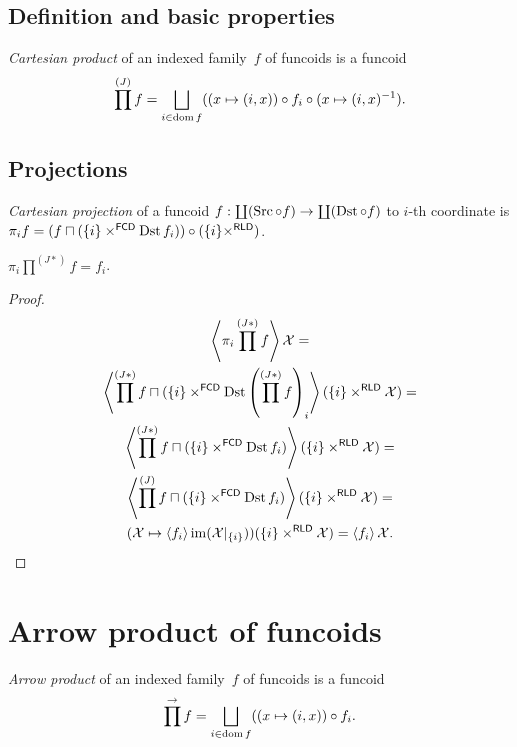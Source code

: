 \subsection{Definition and basic properties}

\begin{defn}
\emph{Cartesian product} of an indexed family~$f$ of funcoids is
a funcoid \[ \prod^{(J)} f=\bigsqcup_{i\in\dom f}((x\mapsto(i,x))\circ f_i\circ(x\mapsto(i,x)^{-1}). \]
\end{defn}

\subsection{Projections}

\begin{defn}
\emph{Cartesian projection} of a funcoid $f: \coprod(\operatorname{Src}\circ f)\to\coprod(\operatorname{Dst}\circ f)$ to $i$-th coordinate is
$\pi_i f=
(f\sqcap(\{i\}\times^{\mathsf{FCD}}\operatorname{Dst} f_i))\circ
(\{i\}\times^{\mathsf{RLD}})$.
\end{defn}

\begin{thm}
$\pi_i\prod^{(J\ast)}f=f_i$.
\end{thm}

\begin{proof}
\begin{multline*}
\left\langle \pi_i\prod^{(J\ast)}f\right\rangle\mathcal{X} =\\
\left\langle \prod^{(J\ast)}f\sqcap(\{i\}\times^{\mathsf{FCD}}\operatorname{Dst} \left(\prod^{(J\ast)}f\right)_i\right\rangle(\{i\}\times^{\mathsf{RLD}}\mathcal{X})=\\
\left\langle \prod^{(J\ast)}f\sqcap(\{i\}\times^{\mathsf{FCD}}\operatorname{Dst} f_i)\right\rangle(\{i\}\times^{\mathsf{RLD}}\mathcal{X})=\\
\left\langle \prod^{(J)}f\sqcap(\{i\}\times^{\mathsf{FCD}}\operatorname{Dst} f_i)\right\rangle(\{i\}\times^{\mathsf{RLD}}\mathcal{X})=\\
(\mathcal{X}\mapsto\left\langle f_i\right\rangle\operatorname{im}(\mathcal{X}|_{\{i\}}))(\{i\}\times^{\mathsf{RLD}}\mathcal{X})=
\left\langle f_i\right\rangle\mathcal{X}.
\end{multline*}
\end{proof}

\section{Arrow product of funcoids}

\begin{defn}
\emph{Arrow product} of an indexed family~$f$ of funcoids is
a funcoid \[ \prod^{\rightarrow} f=\bigsqcup_{i\in\dom f}((x\mapsto(i,x))\circ f_i. \]
\end{defn}

